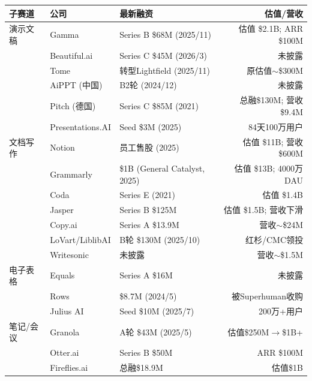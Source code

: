 \begin{keybox}
\small
\begin{tabularx}{\textwidth}{l l X r}
\toprule
\rowcolor{figLightGray}
\textbf{子赛道} & \textbf{公司} & \textbf{最新融资} & \textbf{估值/营收} \\
\midrule
演示文稿 & Gamma          & Series B \$68M (2025/11)     & 估值 \$2.1B; ARR \$100M \\
         & Beautiful.ai   & Series C \$45M (2026/3)      & 未披露 \\
         & Tome           & 转型Lightfield (2025/11)     & 原估值$\sim$\$300M \\
         & AiPPT (中国)   & B2轮 (2024/12)               & 未披露 \\
         & Pitch (德国)   & Series C \$85M (2021)        & 总融\$130M; 营收\$9.4M \\
         & Presentations.AI & Seed \$3M (2025)           & 84天100万用户 \\
\midrule
文档写作 & Notion         & 员工售股 (2025)              & 估值 \$11B; 营收 \$600M \\
         & Grammarly      & \$1B (General Catalyst, 2025) & 估值 \$13B; 4000万DAU \\
         & Coda           & Series E (2021)              & 估值 \$1.4B \\
         & Jasper         & Series B \$125M              & 估值 \$1.5B; 营收下滑 \\
         & Copy.ai        & Series A \$13.9M             & 营收$\sim$\$24M \\
         & LoVart/LiblibAI & B轮 \$130M (2025/10)       & 红杉/CMC领投 \\
         & Writesonic     & 未披露                       & 营收$\sim$\$1.5M \\
\midrule
电子表格 & Equals         & Series A \$16M               & 未披露 \\
         & Rows           & \$8.7M (2024/5)              & 被Superhuman收购 \\
         & Julius AI      & Seed \$10M (2025/7)          & 200万+用户 \\
\midrule
笔记/会议 & Granola       & A轮 \$43M (2025/5)           & 估值\$250M$\to$\$1B+ \\
         & Otter.ai       & Series B \$50M               & ARR \$100M \\
         & Fireflies.ai   & 总融\$18.9M                  & 估值\$1B \\

\end{tabularx}
\end{keybox}
